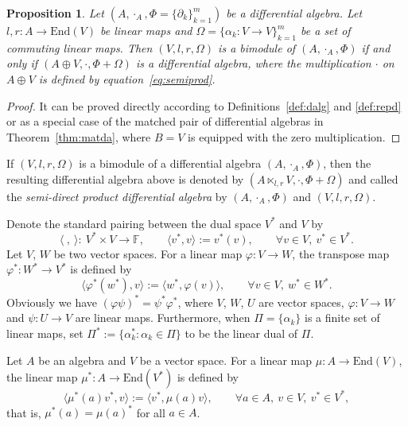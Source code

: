 \documentclass[pdftex]{sigma}
\numberwithin{equation}{section}
\newtheorem{Proposition}[Theorem]{Proposition}
{ \theoremstyle{definition}
	\newtheorem{Definition}[Theorem]{Definition}
	\newtheorem{Note}[Theorem]{Note}
	\newtheorem{Example}[Theorem]{Example}
	\newtheorem{Remark}[Theorem]{Remark} }
\newcommand{\End}{\mathrm{End}}
\begin{document}
\begin{Proposition}\label{pro:semidirect}
 Let $(A, \cdot_A, \Phi = \{\partial_k\}_{k=1}^m)$ be a differential algebra.
 Let $l, r\colon A \to \End (V)$ be linear maps
 and $\Omega = \{\alpha_k\colon V \to V\}_{k=1}^m$ be a set of commuting linear maps.
 Then $(V, l, r, \Omega)$ is a bimodule of $(A, \cdot_A, \Phi)$ if and only if $(A \oplus V, \cdot, \Phi + \Omega)$ is a differential algebra, where the multiplication $\cdot$ on $A \oplus V$ is defined by equation~\eqref{eq:semiprod}.
\end{Proposition}
\begin{proof}
 It can be proved directly according to Definitions~\ref{def:dalg} and \ref{def:repd} or as a special case of the matched pair of differential algebras in Theorem~\ref{thm:matda}, where $B = V$ is equipped with the zero multiplication.
\end{proof}

If $(V, l, r, \Omega)$ is a bimodule of a differential algebra $(A, \cdot_A, \Phi)$, then the resulting differential algebra above is denoted by $(A \ltimes_{l,r} V, \cdot, \Phi + \Omega)$ and called the \textit{semi-direct product differential algebra} by $(A, \cdot_A, \Phi)$ and $(V, l, r, \Omega)$.

Denote the standard pairing between the dual space $V^*$ and $V$ by
\begin{equation*}
 \langle\ ,\ \rangle\colon \ V^* \times V \to \mathbb{F}, \qquad
 \langle v^*, v \rangle :=v^*(v), \qquad
 \forall v \in V,\ v^* \in V^*.
\end{equation*}
Let $V$, $W$ be two vector spaces.
For a linear map $\varphi\colon V \to W$,
the transpose map $\varphi^*\colon W^* \to V^*$ is defined by
\begin{equation*}
 \langle \varphi^*(w^*), v \rangle := \langle w^*, \varphi(v) \rangle, \qquad
 \forall v \in V, \ w^* \in W^*.
\end{equation*}
Obviously we have $(\varphi\psi)^*=\psi^*\varphi^*$, where $V$, $W$, $U$ are vector spaces, $\varphi\colon V \to W$ and $\psi\colon U \to V$ are linear maps.
Furthermore, when $\Pi = \{\alpha_k\}$ is a finite set of linear maps,
set $\Pi^* := \{\alpha_k^*\colon \alpha_k \in \Pi\}$ to be the linear dual of $\Pi$.

Let $A$ be an algebra and $V$ be a vector space.
For a linear map $\mu\colon A \to \End (V)$, the linear map $\mu^*\colon A \to \End(V^*)$ is defined by
\begin{equation*}
 \langle \mu^*(a)v^*, v \rangle := \langle v^*, \mu(a)v \rangle, \qquad
 \forall a \in A,\ v \in V, \ v^* \in V^*,
\end{equation*}
that is, $\mu^*(a) = \mu(a)^*$ for all $a \in A$.
\end{document}
